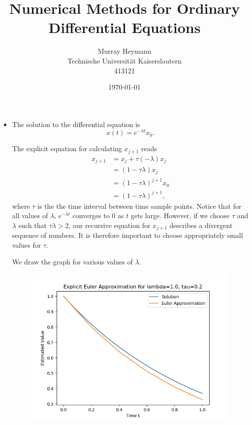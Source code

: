 \documentclass{article}
\title{Numerical Methods for Ordinary Differential Equations}
\author{Murray Heymann \\
	Technische Universit{\"a}t Kaiserslautern \\
	413121}
\date{\today}
\begin{document}
\maketitle


\section{}
\subsection{}
\begin{itemize}
	\item[(a)]
		The solution to the differential equation is \[ x(t) = e
		^{- \lambda t} x_0.\]

		The explicit equation for calculating $x_{j + 1}$ reads
		\begin{align*}
			x_{j + 1} &= x_j + \tau (-\lambda) x_j \\
			&= (1 - \tau \lambda) x_j \\
			&= (1 - \tau \lambda)^{j+1} x_0 \\
			&= (1 - \tau \lambda)^{j+1},
		\end{align*} where $\tau$ is the the time interval between time
		sample points.
		Notice that for all values of $\lambda$, $e^{-\lambda t}$
		converges to $0$ as $t$ gets large.  However, if we choose
		$\tau$ and $\lambda$ such that $\tau \lambda > 2$, our recursive
		equation for $x_{j+1}$ describes a divergent sequence of
		numbers. It is therefore important to choose appropriately small
		values for $\tau$.

		We draw the graph for various values of $\lambda$.
		\begin{figure}[H]
			\includegraphics[scale=0.6]{graph1a_1_02}
		\end{figure}


\end{itemize}
\end{document}
